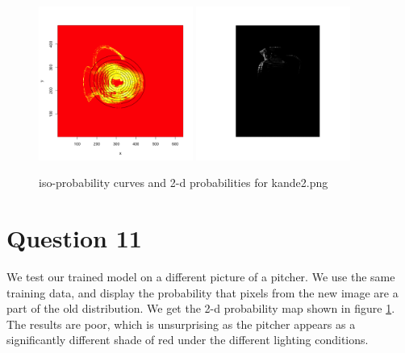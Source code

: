 \begin{figure}[h!]
  \centering
\includegraphics[width=0.45\textwidth]{spat}
\includegraphics[width=0.45\textwidth]{newMap}
\caption{ iso-probability curves and 2-d probabilities for kande2.png}
\label{spat}
\end{figure}

\section*{Question 11}
We test our trained model on a different picture of a pitcher. We use the same training data, and display the probability that pixels from the new image are a part of the old distribution. We get the 2-d probability map shown in figure \ref{spat}. The results are poor, which is unsurprising as the pitcher appears as a significantly different shade of red under the different lighting conditions. 

